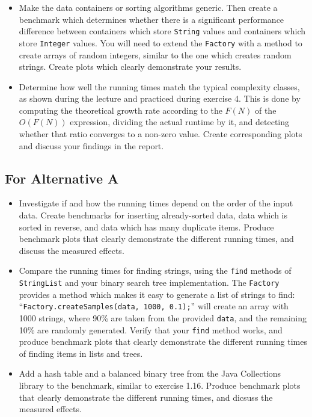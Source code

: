 \documentclass[a4paper,10pt]{article}
\begin{document}
\begin{itemize}

\item
  Make the data containers or sorting algorithms generic.
  Then create a benchmark which determines whether there is a significant performance difference between containers which store \texttt{String} values and containers which store \texttt{Integer} values.
  You will need to extend the \texttt{Factory} with a method to create arrays of random integers, similar to the one which creates random strings.
  Create plots which clearly demonstrate your results.
  
\item
  Determine how well the running times match the typical complexity classes, as shown during the lecture and practiced during exercise 4.
  This is done by computing the theoretical growth rate according to the $F(N)$ of the $O(F(N))$ expression, dividing the actual runtime by it, and detecting whether that ratio converges to a non-zero value.
  Create corresponding plots and discuss your findings in the report.
  
\end{itemize}


\subsection*{For Alternative A}

\begin{itemize}

\item
  Investigate if and how the running times depend on the order of the input data.
  Create benchmarks for inserting already-sorted data, data which is sorted in reverse, and data which has many duplicate items.
  Produce benchmark plots that clearly demonstrate the different running times, and discuss the measured effects.

\item
  Compare the running times for finding strings, using the \texttt{find} methods of \texttt{StringList} and your binary search tree implementation.
  The \texttt{Factory} provides a method which makes it easy to generate a list of strings to find:
  ``\texttt{Factory.create\-Samples(data, 1000, 0.1);}'' will create an array with 1000 strings, where 90\% are taken from the provided \texttt{data}, and the remaining 10\% are randomly generated.
  Verify that your \texttt{find} method works, and produce benchmark plots that clearly demonstrate the different running times of finding items in lists and trees.

\item
  Add a hash table and a balanced binary tree from the Java Collections library to the benchmark, similar to exercise 1.16.
  Produce benchmark plots that clearly demonstrate the different running times, and dicsuss the measured effects.

\end{itemize}
\end{document}
